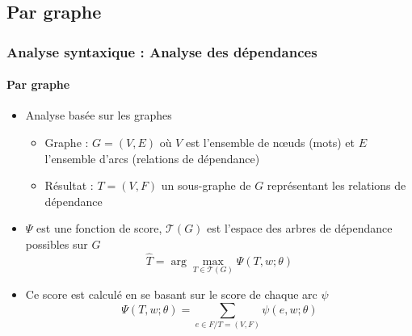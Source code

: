 \documentclass[xcolor=table]{beamer}
\begin{document}
\subsection{Par graphe}

\begin{frame}
\frametitle{Analyse syntaxique : Analyse des dépendances}
\framesubtitle{Par graphe}

\begin{minipage}{.6\textwidth}
	\begin{itemize}
		\item Analyse basée sur les graphes
		\begin{itemize}
			\item Graphe : $G = (V, E)$ où $V$ est l'ensemble de nœuds (mots) et $E$ l'ensemble d'arcs (relations de dépendance)
			\item Résultat : $T = (V, F)$ un sous-graphe de $G$ représentant les relations de dépendance
		\end{itemize}
	\end{itemize}
\end{minipage}
\begin{minipage}{.38\textwidth}
\end{minipage}

\begin{itemize}
	\item $\Psi$ est une fonction de score, $ \mathcal{T}(G) $ est l'espace des arbres de dépendance possibles sur $G$
	\[ \hat{T} = \arg\max\limits_{T \in \mathcal{T}(G)} \Psi(T, w; \theta) \]
	\item Ce score est calculé en se basant sur le score de chaque arc $\psi$
	\[ \Psi(T, w; \theta) = \sum_{e \in F / T = (V, F)} \psi(e, w; \theta) \]
\end{itemize}

\end{frame}
\end{document}
